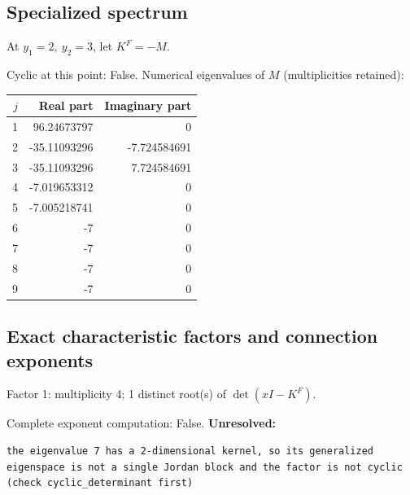 \documentclass[10pt,a4paper]{article}
\newcommand{\fitmath}[1]{\sbox{\mathbox}{$\displaystyle #1$}\ifdim\wd\mathbox>\linewidth\resizebox{\linewidth}{!}{\usebox{\mathbox}}\else\usebox{\mathbox}\fi}
\begin{document}
\subsection*{Specialized spectrum}
At $y_1=2,\ y_2=3$, let $K^F=-M$.
\begin{center}\fitmath{\Delta=0}\end{center}
Cyclic at this point: False.
Numerical eigenvalues of $M$ (multiplicities retained):
\begin{center}\small\begin{tabular}{rrr}\toprule $j$ & Real part & Imaginary part\\\midrule
1 & 96.24673797 & 0\\
2 & -35.11093296 & -7.724584691\\
3 & -35.11093296 & 7.724584691\\
4 & -7.019653312 & 0\\
5 & -7.005218741 & 0\\
6 & -7 & 0\\
7 & -7 & 0\\
8 & -7 & 0\\
9 & -7 & 0\\
\bottomrule\end{tabular}\end{center}
\subsection*{Exact characteristic factors and connection exponents}
Factor 1: multiplicity 4; 1 distinct root(s) of $\det(xI-K^F)$.
\begin{center}\fitmath{\begin{aligned}p_{1}(x)&=x - 7\end{aligned}}\end{center}
Complete exponent computation: False.
\textbf{Unresolved:}

\begin{lstlisting}
the eigenvalue 7 has a 2-dimensional kernel, so its generalized eigenspace is not a single Jordan block and the factor is not cyclic (check cyclic_determinant first)
\end{lstlisting}
\end{document}
